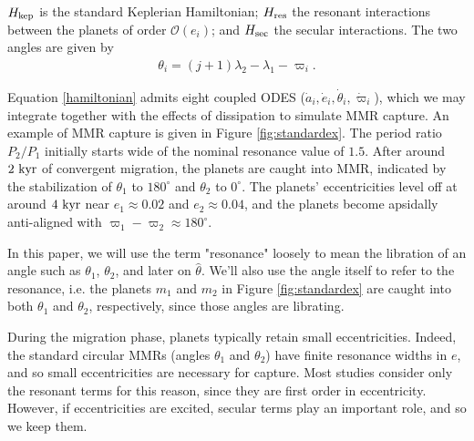 \documentclass{mnras}
\renewcommand{\O}{\mathcal{O}}
\begin{document}
\(H_{\rm kep}\) is the standard Keplerian Hamiltonian; \(H_{\rm res}\)
the resonant interactions between the planets of order
\(\O(e_i)\); and \(H_{\rm sec}\) the secular interactions.
The two angles are given by
\begin{align}
\label{circangles}
 \theta_i = (j+1)\lambda_2 - \lambda_1 - \varpi_i.
\end{align}

Equation \eqref{hamiltonian} admits eight coupled ODES (\(\dot a_i, \dot
e_i, \dot\theta_i, \dot\varpi_i\)), which we may integrate together
with the effects of dissipation to simulate MMR capture.  An example
of MMR capture is given in Figure \ref{fig:standardex}.  The period
ratio \(P_2/P_1\) initially starts wide of the nominal resonance value
of \(1.5\).  After around \(2~\rm{kyr}\) of convergent migration, the
planets are caught into MMR, indicated by the stabilization of
\(\theta_1\) to \(180^\circ\) and \(\theta_2\) to \(0^\circ\).  The planets'
eccentricities level off at around \(4~\rm{kyr}\) near \(e_1\approx 0.02\)
and \(e_2\approx0.04\), and the planets become apsidally anti-aligned
with \(\varpi_1-\varpi_2\approx 180^\circ\).

In this paper, we will use the term "resonance" loosely to mean the
libration of an angle such as \(\theta_1\), \(\theta_2\), and later on
\(\hat\theta\).  We'll also use the angle itself to refer to the
resonance, i.e. the planets \(m_1\) and \(m_2\) in Figure
\ref{fig:standardex} are caught into both \(\theta_1\) and \(\theta_2\),
respectively, since those angles are librating.

During the migration phase, planets typically retain small
eccentricities. Indeed, the standard circular MMRs (angles \(\theta_1\)
and \(\theta_2\)) have finite resonance widths in \(e\), and so small
eccentricities are necessary for capture.  Most studies consider only
the resonant terms for this reason, since they are first order in
eccentricity.  However, if eccentricities are excited, secular terms
play an important role, and so we keep them.
\end{document}
